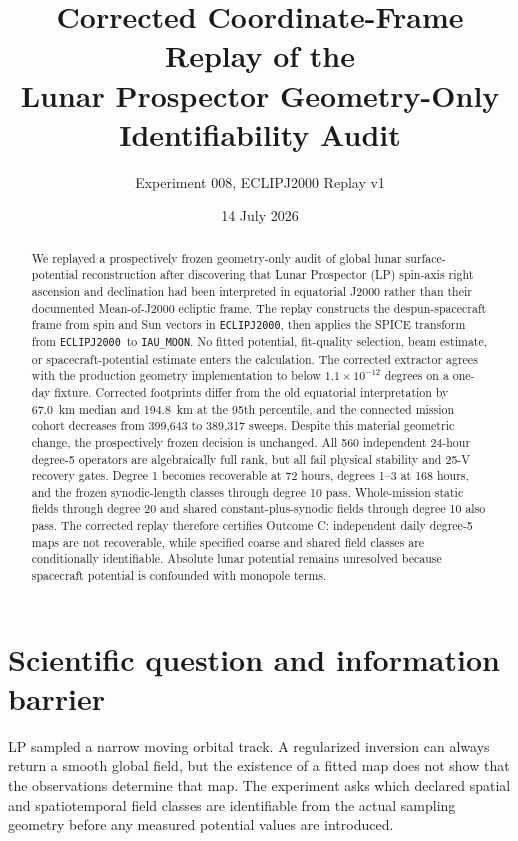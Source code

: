 \documentclass[11pt]{article}
\title{Corrected Coordinate-Frame Replay of the\\
Lunar Prospector Geometry-Only Identifiability Audit}
\author{Experiment 008, ECLIPJ2000 Replay v1}
\date{14 July 2026}
\newcommand{\ECLIP}{\texttt{ECLIPJ2000}}
\newcommand{\MOON}{\texttt{IAU\_MOON}}
\begin{document}
\maketitle

\begin{abstract}
We replayed a prospectively frozen geometry-only audit of global lunar
surface-potential reconstruction after discovering that Lunar Prospector (LP)
spin-axis right ascension and declination had been interpreted in equatorial
J2000 rather than their documented Mean-of-J2000 ecliptic frame.  The replay
constructs the despun-spacecraft frame from spin and Sun vectors in
\ECLIP, then applies the SPICE transform from \ECLIP\ to \MOON.  No fitted
potential, fit-quality selection, beam estimate, or spacecraft-potential
estimate enters the calculation.  The corrected extractor agrees with the
production geometry implementation to below $1.1\times10^{-12}$ degrees on a
one-day fixture.  Corrected footprints differ from the old equatorial
interpretation by 67.0~km median and 194.8~km at the 95th percentile, and the
connected mission cohort decreases from 399,643 to 389,317 sweeps.  Despite
this material geometric change, the prospectively frozen decision is
unchanged.  All 560 independent 24-hour degree-5 operators are algebraically
full rank, but all fail physical stability and 25-V recovery gates.  Degree 1
becomes recoverable at 72 hours, degrees 1--3 at 168 hours, and the frozen
synodic-length classes through degree 10 pass.  Whole-mission static fields
through degree 20 and shared constant-plus-synodic fields through degree 10
also pass.  The corrected replay therefore certifies Outcome C: independent
daily degree-5 maps are not recoverable, while specified coarse and shared
field classes are conditionally identifiable.  Absolute lunar potential
remains unresolved because spacecraft potential is confounded with monopole
terms.
\end{abstract}

\section{Scientific question and information barrier}

LP sampled a narrow moving orbital track.  A regularized inversion can always
return a smooth global field, but the existence of a fitted map does not show
that the observations determine that map.  The experiment asks which declared
spatial and spatiotemporal field classes are identifiable from the actual
sampling geometry before any measured potential values are introduced.
\end{document}
